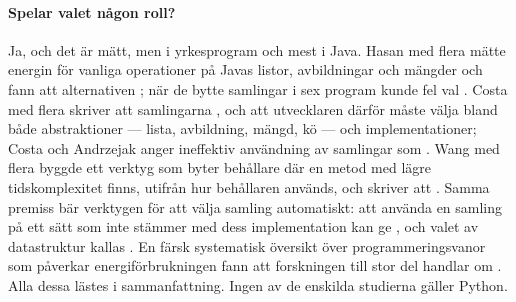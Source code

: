 \paragraph{Spelar valet någon roll?}  Ja, och det är mätt, men i
yrkesprogram och mest i Java.  Hasan med flera mätte energin för vanliga
operationer på Javas listor, avbildningar och mängder och fann att
alternativen ; när de bytte
samlingar i sex program kunde fel val
.  Costa med flera skriver att samlingarna
, och att utvecklaren därför måste välja
bland både abstraktioner --- lista, avbildning, mängd, kö --- och
implementationer; Costa och Andrzejak anger ineffektiv användning av
samlingar som .  Wang med flera byggde ett verktyg som
byter behållare där en metod med lägre tidskomplexitet finns, utifrån
hur behållaren används, och skriver att
.  Samma premiss bär verktygen för att
välja samling automatiskt: att använda en samling på ett sätt som inte
stämmer med dess implementation kan ge
,
och valet av datastruktur kallas .  En färsk
systematisk översikt över programmeringsvanor som påverkar
energiförbrukningen fann att forskningen till stor del handlar om
.  Alla dessa
lästes i sammanfattning.  Ingen av de enskilda studierna gäller Python.

